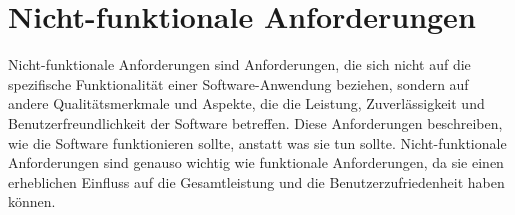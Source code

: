\section{Nicht-funktionale Anforderungen}


Nicht-funktionale Anforderungen sind Anforderungen, die sich nicht auf die 
spezifische Funktionalität einer Software-Anwendung beziehen, sondern auf andere Qualitätsmerkmale 
und Aspekte, die die Leistung, Zuverlässigkeit und Benutzerfreundlichkeit der Software betreffen. 
Diese Anforderungen beschreiben, wie die Software funktionieren sollte, anstatt was sie tun sollte. 
Nicht-funktionale Anforderungen sind genauso wichtig wie funktionale Anforderungen, da sie einen 
erheblichen Einfluss auf die Gesamtleistung und die Benutzerzufriedenheit haben können.